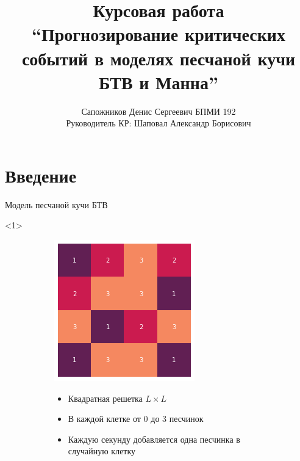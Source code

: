 \documentclass{beamer}
\title[Prediction of Extremes]{Курсовая работа\\``Прогнозирование критических событий в моделях песчаной кучи БТВ и Манна''}
\author[Сапожников Денис]{
	Сапожников Денис Сергеевич БПМИ 192 \\
	\bigskip
	Руководитель КР: Шаповал Александр Борисович
}
\date{\displaydate{date}}
\begin{document}
	\begin{frame}
		\titlepage

	\end{frame}



	\section{Введение}
	\begin{frame}{Модель песчаной кучи БТВ}
		\begin{onlyenv}<1>
			\begin{figure}[ht]
				\centering
				\begin{subfigure}{0.45\textwidth}
					\includegraphics[width=\linewidth]{slides/btw_0}
				\end{subfigure}
				\begin{subfigure}{0.45\textwidth}
					\begin{itemize}
						\item Квадратная решетка $L \times L$
						\item В каждой клетке от $0$ до $3$ песчинок
						\item Каждую секунду добавляется одна песчинка в случайную клетку
					\end{itemize}
				\end{subfigure}
			\end{figure}
		\end{onlyenv}
		

\end{frame}
\end{document}
